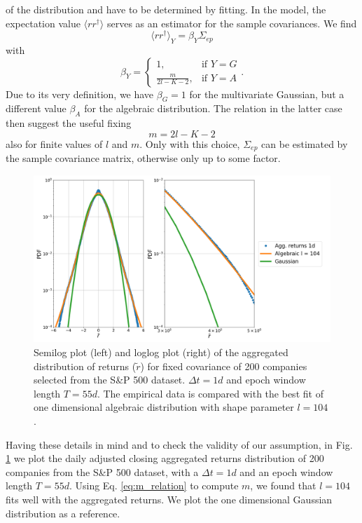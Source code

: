 of the distribution and have to be determined by fitting. In the model, the
expectation value $\langle r r^{\dagger} \rangle$ serves as an estimator for
the sample covariances. We find
\begin{equation}
    \langle r r^{\dagger} \rangle_{Y} = \beta_{Y} \Sigma_{ep}
\end{equation}
with
\begin{equation}
    \beta_{Y}=\begin{cases}
    1, & \text{if }Y=G\\
    \frac{m}{2l-K-2}, & \text{if }Y=A
\end{cases}.
\end{equation}
Due to its very definition, we have $\beta_{G} = 1$ for the multivariate
Gaussian, but a different value $\beta_{A}$ for the algebraic distribution. The
relation in the latter case then suggest the useful fixing
\begin{equation}\label{eq:m_relation}
    m = 2l - K - 2
\end{equation}
also for finite values of $l$ and $m$. Only with this choice, $\Sigma_{ep}$ can
be estimated by the sample covariance matrix, otherwise only up to some factor.

\begin{figure}[htbp]
    \centering
    \includegraphics[width=0.7\columnwidth]
    {figures/05_algebraic_agg_returns_short_epoch.png}
    \caption{Semilog plot (left) and loglog plot (right) of the aggregated
             distribution of returns ($\tilde{r}$) for fixed covariance of 200
             companies selected from the S\&P 500 dataset. $\Delta t = 1d$ and
             epoch window length $T=55d$. The empirical data is compared with
             the best fit of one dimensional algebraic distribution with shape
             parameter $l=104$.}
    \label{fig:algebraic_agg_returns_epoch}
\end{figure}

Having these details in mind and to check the validity of our assumption, in
Fig. \ref{fig:algebraic_agg_returns_epoch} we plot the daily adjusted closing
aggregated returns distribution of 200 companies from the S\&P 500 dataset,
with a $\Delta t = 1d$ and an epoch window length $T = 55d$. Using Eq.
\ref{eq:m_relation} to compute $m$, we found that $l = 104$ fits well with the
aggregated returns. We plot the one dimensional Gaussian distribution as a
reference.

